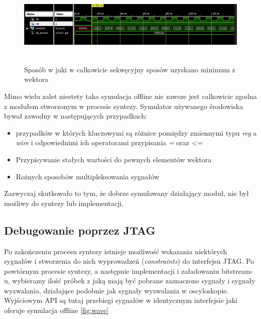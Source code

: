 \begin{figure}[h]
    \begin{center}

    \includegraphics[height = 4cm]{figures/wave.png}
    \caption["Minimum kombinacyjne"]{Sposób w jaki w całkowicie sekwęcyjny sposów
    uzyskano minimum z wektora}
    \label{fig:combmin}
    \end{center}
\end{figure}


Mimo wielu zalet niestety taka symulacja offline nie zawsze jest całkowicie zgodna
z modułem stworzonym w procesie syntezy. Symulator używanego środowiska bywał
zawodny w następujących przypadkach:
\begin{itemize}
\item przypadków w których kluczowymi są różnice pomiędzy zmiennymi typu
\textit{reg} a \textit{wire} i odpowiednimi ich operatorami przypisania
\textit{=} oraz \textit{<=}
\item Przypisywanie stałych wartości do pewnych elementów wektora
\item Rożnych sposobów multipleksowania sygnałów
\end{itemize}

Zazwyczaj skutkowało to tym, że dobrze symulowany działający moduł, nie był możliwy
do syntezy lub implementacji.


\subsection{Debugowanie poprzez JTAG}
\label{sec:logika:debug:jtag}

Po zakończeniu procesu syntezy istnieje możliwość wskazania niektórych sygnałów
i stworzenia do nich wyprowadzeń (\textit{constraints}) do interfejsu JTAG.
Po powtórnym procesie syntezy, a następnie implementacji i załadowaniu bitstream-u,
wybieramy ilość próbek z jaką mają być pobrane zaznaczone sygnały i sygnały wyzwalania,
działające podobnie jak sygnały wyzwalania w oscyloskopie. Wyjściowym API
są tutaj przebiegi sygnałów w identycznym interfejsie jaki oferuje symulacja offline
\ref{fig:wave}

